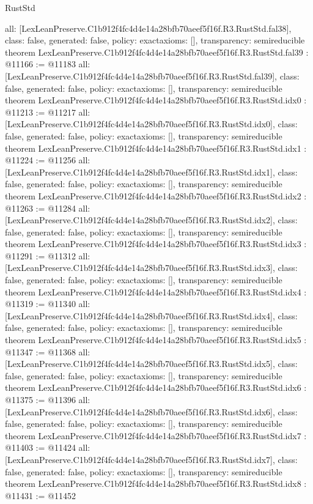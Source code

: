 \begin{lexlean}{RustStd}
\begin{coremodule}
{  all: [LexLeanPreserve.C1b912f4fc4d4e14a28bfb70aeef5f16f.R3.RustStd.fal38],
  class: false,
  generated: false,
  policy: exact{axioms: []},
  transparency: semireducible
}
theorem LexLeanPreserve.C1b912f4fc4d4e14a28bfb70aeef5f16f.R3.RustStd.fal39 : @11166 := @11183 {
  all: [LexLeanPreserve.C1b912f4fc4d4e14a28bfb70aeef5f16f.R3.RustStd.fal39],
  class: false,
  generated: false,
  policy: exact{axioms: []},
  transparency: semireducible
}
theorem LexLeanPreserve.C1b912f4fc4d4e14a28bfb70aeef5f16f.R3.RustStd.idx0 : @11213 := @11217 {
  all: [LexLeanPreserve.C1b912f4fc4d4e14a28bfb70aeef5f16f.R3.RustStd.idx0],
  class: false,
  generated: false,
  policy: exact{axioms: []},
  transparency: semireducible
}
theorem LexLeanPreserve.C1b912f4fc4d4e14a28bfb70aeef5f16f.R3.RustStd.idx1 : @11224 := @11256 {
  all: [LexLeanPreserve.C1b912f4fc4d4e14a28bfb70aeef5f16f.R3.RustStd.idx1],
  class: false,
  generated: false,
  policy: exact{axioms: []},
  transparency: semireducible
}
theorem LexLeanPreserve.C1b912f4fc4d4e14a28bfb70aeef5f16f.R3.RustStd.idx2 : @11263 := @11284 {
  all: [LexLeanPreserve.C1b912f4fc4d4e14a28bfb70aeef5f16f.R3.RustStd.idx2],
  class: false,
  generated: false,
  policy: exact{axioms: []},
  transparency: semireducible
}
theorem LexLeanPreserve.C1b912f4fc4d4e14a28bfb70aeef5f16f.R3.RustStd.idx3 : @11291 := @11312 {
  all: [LexLeanPreserve.C1b912f4fc4d4e14a28bfb70aeef5f16f.R3.RustStd.idx3],
  class: false,
  generated: false,
  policy: exact{axioms: []},
  transparency: semireducible
}
theorem LexLeanPreserve.C1b912f4fc4d4e14a28bfb70aeef5f16f.R3.RustStd.idx4 : @11319 := @11340 {
  all: [LexLeanPreserve.C1b912f4fc4d4e14a28bfb70aeef5f16f.R3.RustStd.idx4],
  class: false,
  generated: false,
  policy: exact{axioms: []},
  transparency: semireducible
}
theorem LexLeanPreserve.C1b912f4fc4d4e14a28bfb70aeef5f16f.R3.RustStd.idx5 : @11347 := @11368 {
  all: [LexLeanPreserve.C1b912f4fc4d4e14a28bfb70aeef5f16f.R3.RustStd.idx5],
  class: false,
  generated: false,
  policy: exact{axioms: []},
  transparency: semireducible
}
theorem LexLeanPreserve.C1b912f4fc4d4e14a28bfb70aeef5f16f.R3.RustStd.idx6 : @11375 := @11396 {
  all: [LexLeanPreserve.C1b912f4fc4d4e14a28bfb70aeef5f16f.R3.RustStd.idx6],
  class: false,
  generated: false,
  policy: exact{axioms: []},
  transparency: semireducible
}
theorem LexLeanPreserve.C1b912f4fc4d4e14a28bfb70aeef5f16f.R3.RustStd.idx7 : @11403 := @11424 {
  all: [LexLeanPreserve.C1b912f4fc4d4e14a28bfb70aeef5f16f.R3.RustStd.idx7],
  class: false,
  generated: false,
  policy: exact{axioms: []},
  transparency: semireducible
}
theorem LexLeanPreserve.C1b912f4fc4d4e14a28bfb70aeef5f16f.R3.RustStd.idx8 : @11431 := @11452 {
}
\end{coremodule}
\end{lexlean}
